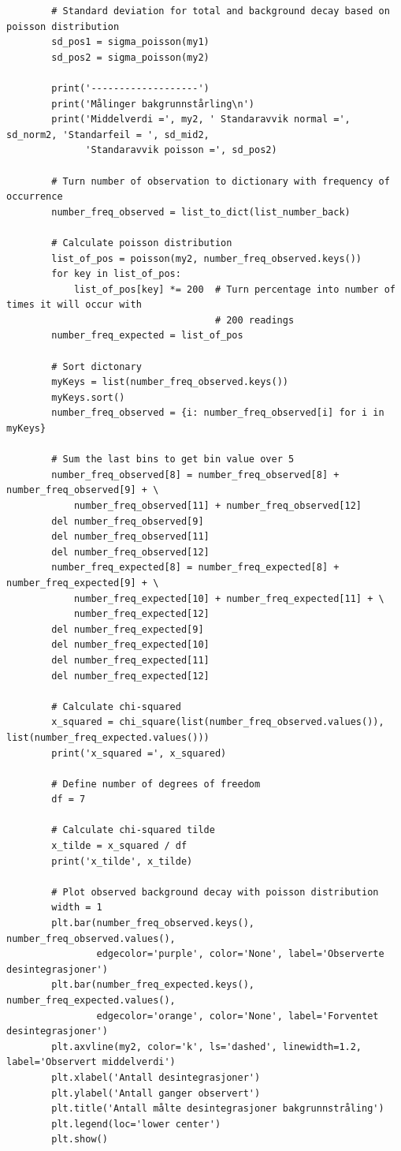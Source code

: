 \documentclass[twocolumn, 11pt]{article} %
\begin{document}
\begin{lstlisting}
        # Standard deviation for total and background decay based on poisson distribution
        sd_pos1 = sigma_poisson(my1)
        sd_pos2 = sigma_poisson(my2)

        print('-------------------')
        print('Målinger bakgrunnstårling\n')
        print('Middelverdi =', my2, ' Standaravvik normal =', sd_norm2, 'Standarfeil = ', sd_mid2,
              'Standaravvik poisson =', sd_pos2)

        # Turn number of observation to dictionary with frequency of occurrence
        number_freq_observed = list_to_dict(list_number_back)

        # Calculate poisson distribution
        list_of_pos = poisson(my2, number_freq_observed.keys())
        for key in list_of_pos:
            list_of_pos[key] *= 200  # Turn percentage into number of times it will occur with
                                     # 200 readings
        number_freq_expected = list_of_pos

        # Sort dictonary
        myKeys = list(number_freq_observed.keys())
        myKeys.sort()
        number_freq_observed = {i: number_freq_observed[i] for i in myKeys}

        # Sum the last bins to get bin value over 5
        number_freq_observed[8] = number_freq_observed[8] + number_freq_observed[9] + \
            number_freq_observed[11] + number_freq_observed[12]
        del number_freq_observed[9]
        del number_freq_observed[11]
        del number_freq_observed[12]
        number_freq_expected[8] = number_freq_expected[8] + number_freq_expected[9] + \
            number_freq_expected[10] + number_freq_expected[11] + \
            number_freq_expected[12]
        del number_freq_expected[9]
        del number_freq_expected[10]
        del number_freq_expected[11]
        del number_freq_expected[12]

        # Calculate chi-squared
        x_squared = chi_square(list(number_freq_observed.values()), list(number_freq_expected.values()))
        print('x_squared =', x_squared)

        # Define number of degrees of freedom
        df = 7

        # Calculate chi-squared tilde
        x_tilde = x_squared / df
        print('x_tilde', x_tilde)

        # Plot observed background decay with poisson distribution
        width = 1
        plt.bar(number_freq_observed.keys(), number_freq_observed.values(),
                edgecolor='purple', color='None', label='Observerte desintegrasjoner')
        plt.bar(number_freq_expected.keys(), number_freq_expected.values(),
                edgecolor='orange', color='None', label='Forventet desintegrasjoner')
        plt.axvline(my2, color='k', ls='dashed', linewidth=1.2, label='Observert middelverdi')
        plt.xlabel('Antall desintegrasjoner')
        plt.ylabel('Antall ganger observert')
        plt.title('Antall målte desintegrasjoner bakgrunnstråling')
        plt.legend(loc='lower center')
        plt.show()


\end{lstlisting}
\end{document}
